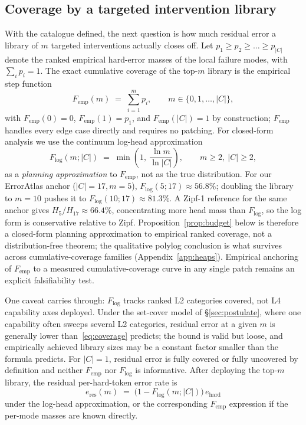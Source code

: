 \documentclass{article}
\theoremstyle{taeplain}
\theoremstyle{taedefn}
\newcommand{\teApprox}{\ensuremath{\approx}}
\begin{document}
\subsection{Coverage by a targeted intervention library}
\label{sec:coverage}

With the catalogue defined, the next question is how much residual error a library of $m$ targeted interventions actually closes off. Let $p_1 \geq p_2 \geq \dots \geq p_{|C|}$ denote the ranked empirical hard-error masses of the local failure modes, with $\sum_i p_i = 1$. The exact cumulative coverage of the top-$m$ library is the empirical step function
\begin{equation}\label{eq:Femp}
F_{\text{emp}}(m) \;=\; \sum_{i=1}^{m} p_i, \qquad m \in \{0, 1, \ldots, |C|\},
\end{equation}
with $F_{\text{emp}}(0) = 0$, $F_{\text{emp}}(1) = p_1$, and $F_{\text{emp}}(|C|) = 1$ by construction; $F_{\text{emp}}$ handles every edge case directly and requires no patching. For closed-form analysis we use the continuum log-head approximation
\begin{equation}\label{eq:coverage}
F_{\log}(m; |C|) \;=\; \min\!\left(1,\ \frac{\ln m}{\ln |C|}\right), \qquad m \geq 2,\ |C| \geq 2,
\end{equation}
as a \emph{planning approximation} to $F_{\text{emp}}$, not as the true distribution. For our ErrorAtlas anchor ($|C|=17, m=5$), $F_{\log}(5;17) \teApprox 56.8\%$; doubling the library to $m=10$ pushes it to $F_{\log}(10;17) \teApprox 81.3\%$. A Zipf-1 reference for the same anchor gives $H_5/H_{17} \teApprox 66.4\%$, concentrating more head mass than $F_{\log}$, so the log form is conservative relative to Zipf. Proposition~\ref{prop:budget} below is therefore a closed-form planning approximation to empirical ranked coverage, not a distribution-free theorem; the qualitative polylog conclusion is what survives across cumulative-coverage families (Appendix~\ref{app:heaps}). Empirical anchoring of $F_{\text{emp}}$ to a measured cumulative-coverage curve in any single patch remains an explicit falsifiability test.

One caveat carries through: $F_{\log}$ tracks ranked L2 categories covered, not L4 capability axes deployed. Under the set-cover model of \S\ref{sec:postulate}, where one capability often sweeps several L2 categories, residual error at a given $m$ is generally lower than~\eqref{eq:coverage} predicts; the bound is valid but loose, and empirically achieved library sizes may be a constant factor smaller than the formula predicts. For $|C| = 1$, residual error is fully covered or fully uncovered by definition and neither $F_{\text{emp}}$ nor $F_{\log}$ is informative. After deploying the top-$m$ library, the residual per-hard-token error rate is
\begin{equation}\label{eq:eres}
e_{\text{res}}(m) \;=\; \bigl(1 - F_{\log}(m; |C|)\bigr)\, e_{\text{hard}}
\end{equation}
under the log-head approximation, or the corresponding $F_{\text{emp}}$ expression if the per-mode masses are known directly.
\end{document}

